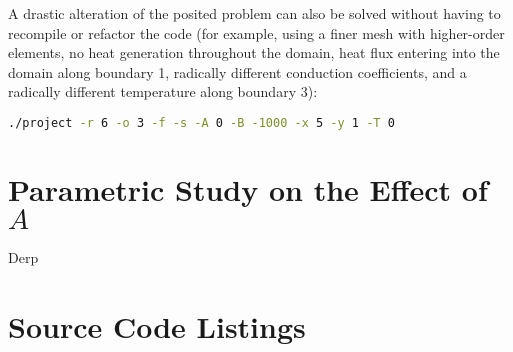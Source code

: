 \documentclass[letterpaper,10pt]{article}
\begin{document}
A drastic alteration of the posited problem can also be solved without having to recompile or refactor the code (for example, using a finer mesh with higher-order elements, no heat generation throughout the domain, heat flux entering into the domain along boundary 1, radically different conduction coefficients, and a radically different temperature along boundary 3):
\vspace{-6mm}
\begin{lstlisting}[numbers=none,frame=none,language=bash]
./project -r 6 -o 3 -f -s -A 0 -B -1000 -x 5 -y 1 -T 0
\end{lstlisting}
\vspace{1mm}

\section{Parametric Study on the Effect of $A$}
Derp

\pagebreak
\appendix
\addappheadtotoc
\makeatletter
\def\@seccntformat#1{Appendix\ \csname the#1\endcsname:\ }
\makeatother
\renewcommand{\thepage}{\thesection-\arabic{page}}
\setcounter{page}{1}

\section{Source Code Listings}
\label{app:source}



\end{document}

